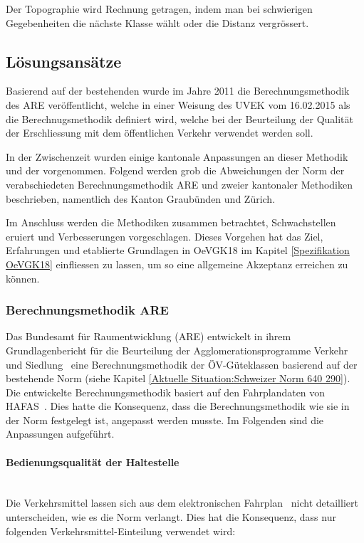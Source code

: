 Der Topographie wird Rechnung getragen, indem man bei schwierigen Gegebenheiten die nächste Klasse wählt oder die Distanz vergrössert.

\subsection{Lösungsansätze}
\label{Stand der Technik:Lösungsansätze}
Basierend auf der bestehenden  wurde im Jahre 2011 die Berechnungsmethodik des \ac{ARE} veröffentlicht, welche in einer Weisung des \acs{UVEK} vom 16.02.2015 als die Berechnugsmethodik definiert wird, welche bei der Beurteilung der Qualität der Erschliessung mit dem öffentlichen Verkehr verwendet werden soll.

In der Zwischenzeit wurden einige kantonale Anpassungen an dieser Methodik und der  vorgenommen.
Folgend werden grob die Abweichungen der Norm der verabschiedeten Berechnungsmethodik ARE und zweier kantonaler Methodiken beschrieben, namentlich des Kanton Graubünden und Zürich.

Im Anschluss werden die Methodiken zusammen betrachtet, Schwachstellen eruiert und Verbesserungen vorgeschlagen.
Dieses Vorgehen hat das Ziel, Erfahrungen und etablierte Grundlagen in \gls{OeVGK18} im Kapitel \ref{Spezifikation OeVGK18} einfliessen zu lassen, um so eine allgemeine Akzeptanz erreichen zu können.

\subsubsection{Berechnungsmethodik ARE}
\label{Lösungsansätze:Berechnungsmethodik ARE}
Das Bundesamt für Raumentwicklung (ARE) entwickelt in ihrem Grundlagenbericht für die Beurteilung der Agglomerationsprogramme Verkehr und Siedlung~\cite{berechnung_are} eine Berechnungsmethodik der \acs{ÖV}-Güteklassen basierend auf der bestehende Norm (siehe Kapitel \ref{Aktuelle Situation:Schweizer Norm 640 290}).
Die entwickelte Berechnungsmethodik basiert auf den Fahrplandaten von HAFAS~\cite{sbb_hafas_spec}.
Dies hatte die Konsequenz, dass die Berechnungsmethodik wie sie in der Norm festgelegt ist, angepasst werden musste.
Im Folgenden sind die Anpassungen aufgeführt.

\paragraph{Bedienungsqualität der Haltestelle}~\\
\label{Berechnungsmethodik ARE:Bedienungsqualität der Haltestelle}
Die Verkehrsmittel lassen sich aus dem elektronischen Fahrplan~\cite{sbb_hafas_spec} nicht detailliert unterscheiden, wie es die Norm verlangt.
Dies hat die Konsequenz, dass nur folgenden Verkehrsmittel-Einteilung verwendet wird:

